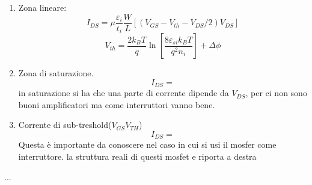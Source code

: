 \begin{enumerate}
    \item Zona lineare:
        \begin{equation}
            I_{DS}=\mu \dfrac{\varepsilon_i}{t_i}\dfrac{W}{L}[(V_{GS}-V_{th}-V_{DS}/2)V_{DS}]
        \end{equation}
        \begin{equation}
            V_{th}=\dfrac{2k_BT}{q}\ln{\left[ \dfrac{8 \varepsilon_{si} k_BT}{q^2 n_i}\right]}+ \Delta \phi
        \end{equation}
    \item Zona di saturazione.
        \begin{equation}
            I_{DS}=
        \end{equation}
        in saturazione si ha che una parte di corrente dipende da $V_{DS}$, per ci non sono buoni amplificatori ma come interruttori vanno bene.
    \item Corrente di sub-treshold($V_{GS}V_{TH}$)
        \begin{equation}
            I_{DS}=
        \end{equation}
        Questa è importante da conoscere nel caso in cui si usi il mosfer come interruttore. la struttura reali di questi mosfet e riporta a destra
\end{enumerate}


...
